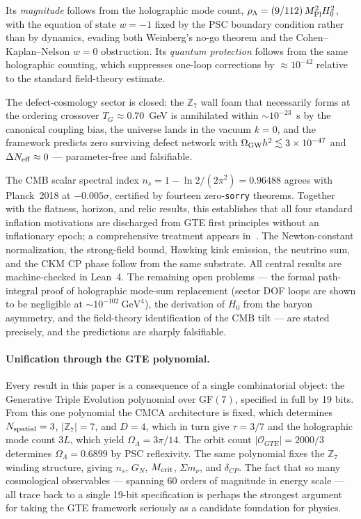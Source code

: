 \documentclass[11pt]{article}
\theoremstyle{remark}
\newcommand{\ZS}{\mathbb{Z}_7}
\newcommand{\MPl}{M_{\rm Pl}}
\newcommand{\Hnought}{H_0}
\newcommand{\OmL}{\Omega_\Lambda}
\newcommand{\ns}{n_s}
\begin{document}
Its \emph{magnitude} follows from the
holographic mode count, $\rho_\Lambda = (9/112)\,\MPl^2\Hnought^2$, with the
equation of state $w = -1$ fixed by the PSC boundary condition rather than by
dynamics, evading both Weinberg's no-go theorem and the Cohen--Kaplan--Nelson
$w = 0$ obstruction. Its \emph{quantum protection} follows from the same holographic
counting, which suppresses one-loop corrections by $\approx 10^{-42}$ relative to
the standard field-theory estimate.

The defect-cosmology sector is closed: the
$\ZS$ wall foam that necessarily forms at the ordering crossover
$T_G \approx 0.70$~GeV is annihilated within $\sim\!10^{-23}$~s by the
canonical coupling bias, the universe lands in the vacuum $k = 0$, and the
framework predicts zero surviving defect network with
$\Omega_{\rm GW}h^2 \lesssim 3\times10^{-47}$ and
$\Delta N_{\rm eff} \approx 0$ --- parameter-free and falsifiable.

The CMB
scalar spectral index $\ns = 1 -
\ln2/(2\pi^2) = 0.96488$ agrees with Planck~2018 at $-0.005\sigma$, certified by
fourteen zero-\texttt{sorry} theorems.  Together with the flatness, horizon, and
relic results, this establishes that all four standard inflation motivations are
discharged from GTE first principles without an inflationary epoch; a comprehensive
treatment appears in~\cite{SpivackGTECompleteFramework}. The Newton-constant normalization, the
strong-field bound, Hawking kink emission, the neutrino sum, and the CKM CP phase
follow from the same substrate. All central results are machine-checked in Lean~4.
The remaining open problems --- the formal path-integral proof of holographic
mode-sum replacement (sector DOF loops are shown to be negligible at
$\sim10^{-102}~\text{GeV}^4$), the derivation of $\Hnought$ from the baryon
asymmetry, and the field-theory identification of the CMB tilt --- are stated
precisely, and the predictions are sharply falsifiable.

\paragraph{Unification through the GTE polynomial.}
Every result in this paper is a consequence of a single combinatorial object: the
Generative Triple Evolution polynomial over $\mathrm{GF}(7)$, specified in full by 19 bits.
From this one polynomial the CMCA architecture is fixed, which determines $N_{\rm spatial} = 3$,
$|\ZS| = 7$, and $D = 4$, which in turn give $\tau = 3/7$ and the holographic mode count
$3L$, which yield $\OmL = 3\pi/14$. The orbit count $|\mathcal{O}_{GTE}| = 2000/3$
determines $\OmL = 0.6899$ by PSC reflexivity. The same polynomial fixes the $\mathbb{Z}_7$ winding
structure, giving $n_s$, $G_N$, $M_{\rm crit}$, $\Sigma m_\nu$, and $\delta_{CP}$.
The fact that so many cosmological observables --- spanning 60 orders of magnitude in energy
scale --- all trace back to a single 19-bit specification is perhaps the strongest argument
for taking the GTE framework seriously as a candidate foundation for physics.
\end{document}
